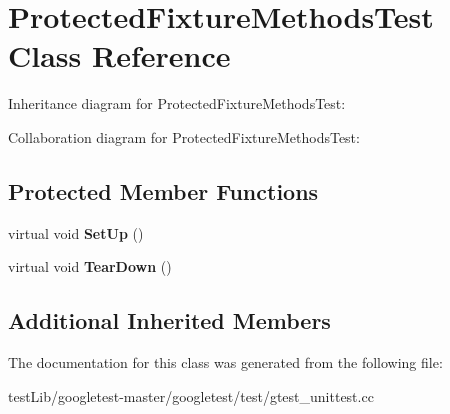 \hypertarget{classProtectedFixtureMethodsTest}{}\section{Protected\+Fixture\+Methods\+Test Class Reference}
\label{classProtectedFixtureMethodsTest}


Inheritance diagram for Protected\+Fixture\+Methods\+Test\+:


Collaboration diagram for Protected\+Fixture\+Methods\+Test\+:
\subsection*{Protected Member Functions}
\begin{DoxyCompactItemize}
\item 
\mbox{\label{classProtectedFixtureMethodsTest_a5184c708ac89cfb69f0e4c742e93398a}} 
virtual void {\bfseries Set\+Up} ()
\item 
\mbox{\label{classProtectedFixtureMethodsTest_aa143dff0a99903cde207b6fd0042c03c}} 
virtual void {\bfseries Tear\+Down} ()
\end{DoxyCompactItemize}
\subsection*{Additional Inherited Members}


The documentation for this class was generated from the following file\+:\begin{DoxyCompactItemize}
\item 
test\+Lib/googletest-\/master/googletest/test/gtest\+\_\+unittest.\+cc\end{DoxyCompactItemize}
